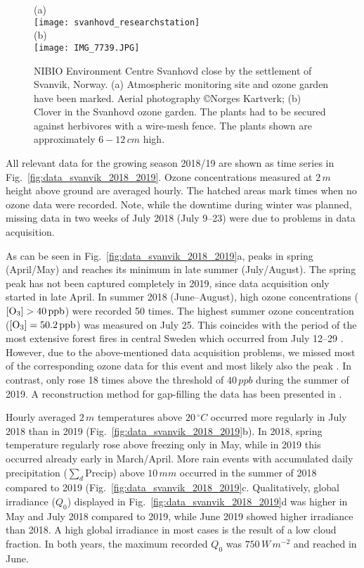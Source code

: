 \documentclass[bg, manuscript]{copernicus}
\begin{document}
\begin{figure}[t]
  \centering
  (a)\\
  \texttt{[image: svanhovd\_researchstation]}\\
  (b)\\
  \texttt{[image: IMG\_7739.JPG]}
  \caption{NIBIO Environment Centre Svanhovd close by the settlement of Svanvik, Norway. (a) Atmospheric monitoring site and ozone garden have been marked. Aerial photography \copyright Norges Kartverk; (b) Clover in the Svanhovd ozone garden. The plants had to be secured against herbivores with a wire-mesh fence. The plants shown are approximately $6-12\,\unit{cm}$ high.}
  \label{fig:svanhovd_research_station}
\end{figure}

All relevant data for the growing season 2018/19 are shown as time series in Fig.~\ref{fig:data_svanvik_2018_2019}. Ozone concentrations measured at $2\,\unit{m}$ height above ground are averaged hourly. The hatched areas mark times when no ozone data were recorded. Note, while the downtime during winter was planned, missing data in two weeks of July 2018 (July 9--23) were due to problems in data acquisition.

As can be seen in Fig.~\ref{fig:data_svanvik_2018_2019}a, \chem{[O_3]} peaks in spring (April/May) and reaches its minimum in late summer (July/August). The spring peak has not been captured completely in 2019, since data acquisition only started in late April. In summer 2018 (June--August), high ozone concentrations ($\chem{[O_3]} > 40\,\unit{ppb}$) were recorded 50 times. The highest summer ozone concentration ($\chem{[O_3]} = 50.2\,\unit{ppb}$) was measured on July 25. This coincides with the period of the most extensive forest fires in central Sweden which occurred from July 12--29 \citep{SOU2019}. However, due to the above-mentioned data acquisition problems, we missed most of the corresponding ozone data for this event and most likely also the peak \chem{[O_3]}. In contrast, \chem{[O_3]} only rose 18 times above the threshold of $40\,\unit{ppb}$ during the summer of 2019. A reconstruction method for gap-filling the data has been presented in \citet{ACPD:Falk2021}.

Hourly averaged $2\,\unit{m}$ temperatures above $20\,\unit{^\circ C}$ occurred more regularly in July 2018 than in 2019 (Fig.~\ref{fig:data_svanvik_2018_2019}b). In 2018, spring temperature regularly rose above freezing only in May, while in 2019 this occurred already early in March/April.
More rain events with accumulated daily precipitation ($\sum_d \mathrm{Precip}$) above $10\,\unit{mm}$ occurred in the summer of 2018 compared to 2019 (Fig.~\ref{fig:data_svanvik_2018_2019}c.
Qualitatively, global irradiance ($Q_0$) displayed in Fig.~\ref{fig:data_svanvik_2018_2019}d was higher in May and July 2018 compared to 2019, while June 2019 showed higher irradiance than 2018. A high global irradiance in most cases is the result of a low cloud fraction. In both years, the maximum recorded $Q_0$ was $750\,\unit{W\,m^{-2}}$ and reached in June.
\end{document}
